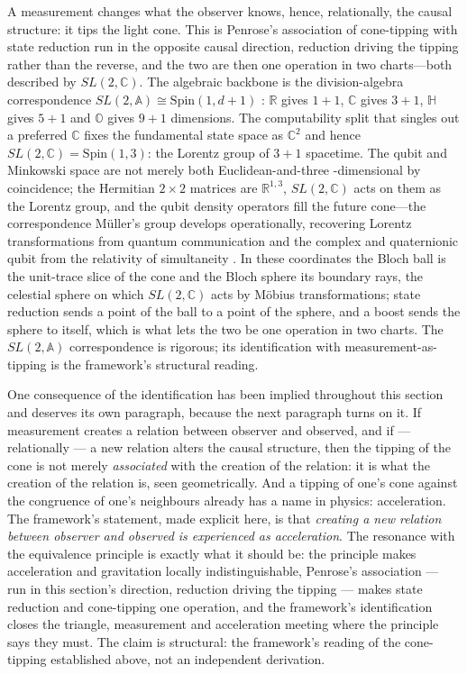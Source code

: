 A measurement changes what the observer knows, hence, relationally, the causal
structure: it tips the light cone. This is Penrose's association of cone-tipping
with state reduction \autocite{Penrose1996} run in the opposite causal direction,
reduction driving the tipping rather than the reverse, and the two are then one
operation in two charts---both described by $SL(2,\mathbb{C})$. The algebraic
backbone is the division-algebra correspondence
$SL(2,\mathbb{A})\cong\mathrm{Spin}(1,d{+}1)$ \autocite{baez2002octonions}: $\mathbb{R}$
gives $1{+}1$, $\mathbb{C}$ gives $3{+}1$, $\mathbb{H}$ gives $5{+}1$ and
$\mathbb{O}$ gives $9{+}1$ dimensions. The computability split that singles out a
preferred $\mathbb{C}$ fixes the fundamental state space as $\mathbb{C}^{2}$ and
hence $SL(2,\mathbb{C})=\mathrm{Spin}(1,3)$: the Lorentz group of $3{+}1$
spacetime. The qubit and Minkowski space are not merely both Euclidean-and-three%
-dimensional by coincidence; the Hermitian $2\times2$ matrices are
$\mathbb{R}^{1,3}$, $SL(2,\mathbb{C})$ acts on them as the Lorentz group, and the
qubit density operators fill the future cone---the correspondence M\"uller's group
develops operationally, recovering Lorentz transformations from quantum
communication \autocite{HohnMueller2016} and the complex and quaternionic qubit
from the relativity of simultaneity \autocite{GarnerMuellerDahlsten2017}.
In these coordinates the Bloch ball is the unit-trace slice of the cone and the Bloch sphere its
boundary rays, the celestial sphere on which $SL(2,\mathbb{C})$ acts by M\"obius
transformations; state reduction sends a point of the ball to a point of the sphere, and a boost
sends the sphere to itself, which is what lets the two be one operation in two charts.
The $SL(2,\mathbb{A})$ correspondence is rigorous; its identification with
measurement-as-tipping is the framework's structural reading.

One consequence of the identification has been implied throughout this section and deserves its own
paragraph, because the next paragraph turns on it. If measurement creates a relation between
observer and observed, and if --- relationally --- a new relation alters the causal structure, then
the tipping of the cone is not merely \emph{associated} with the creation of the relation: it is
what the creation of the relation is, seen geometrically. And a tipping of one's cone against the
congruence of one's neighbours already has a name in physics: acceleration. The framework's
statement, made explicit here, is that \emph{creating a new relation between observer and observed
is experienced as acceleration}. The resonance with the equivalence principle is exactly what it
should be: the principle makes acceleration and gravitation locally indistinguishable, Penrose's
association --- run in this section's direction, reduction driving the tipping --- makes state
reduction and cone-tipping one operation, and the framework's identification closes the triangle,
measurement and acceleration meeting where the principle says they must. The claim is structural:
the framework's reading of the cone-tipping established above, not an independent derivation.

